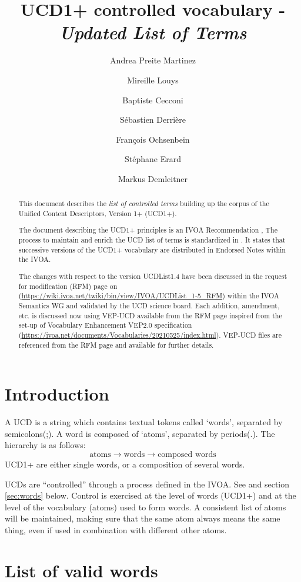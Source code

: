 \documentclass[11pt,a4paper]{ivoa}
\title{UCD1+ controlled vocabulary - \emph{Updated List of Terms}}
\author{Andrea Preite Martinez}
\author{Mireille Louys}
\author{Baptiste Cecconi}
\author{S\'ebastien Derri\`ere}
\author{Fran\c cois Ochsenbein}
\author{St\'ephane Erard}
\author{Markus Demleitner}
\begin{document}
\begin{abstract}
This document describes the \emph{list of controlled terms}  building up the corpus of the Unified Content Descriptors, Version 1+ (UCD1+). 

The document describing the UCD1+ principles is an IVOA Recommendation \citep{2018ivoa.spec.0527P},
The process to maintain and enrich the UCD list of terms is standardized in   \citep{2019ivoa.spec.1007G}.
It states that successive versions of the UCD1+ vocabulary are distributed in Endorsed Notes within the IVOA.

The changes with respect to the version UCDList1.4 have been discussed in the request for modification (RFM) page on (\url{https://wiki.ivoa.net/twiki/bin/view/IVOA/UCDList_1-5_RFM}) within the IVOA Semantics WG and validated by the UCD science board.
Each addition, amendment, etc.  is discussed now using VEP-UCD available from the RFM page  inspired from the set-up of Vocabulary Enhancement VEP2.0 specification (\url{https://ivoa.net/documents/Vocabularies/20210525/index.html}). 
VEP-UCD files are referenced from the RFM page and available for further details.
\end{abstract} 

\section{Introduction}

A UCD is a string which contains textual tokens called `words', separated by semicolons(;). A word is 
composed of `atoms', separated by periods(.). The hierarchy is as follows: 
$$
\textrm{atoms} \rightarrow \textrm{words} \rightarrow \textrm{composed words}
$$
UCD1+ are either single words, or a composition of several words.

UCDs are ``controlled'' through a process defined in the IVOA. See \citet{2005ivoa.spec.0819D} and 
section \ref{sec:words} below. Control is exercised at the level of words (UCD1+) and at the level 
of the vocabulary (atoms) used to form words. A consistent list of atoms will be maintained, making 
sure that the same atom always means the same thing, even if used in combination with different other 
atoms. 


\section{List of valid words}
\label{sec:list}
\end{document}
